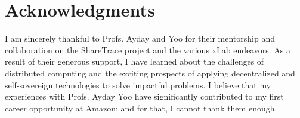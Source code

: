 \section*{Acknowledgments}
I am sincerely thankful to Profs. Ayday and Yoo for their mentorship and collaboration on the ShareTrace project and the various xLab endeavors. As a result of their generous support, I have learned about the challenges of distributed computing and the exciting prospects of applying decentralized and self-sovereign technologies to solve impactful problems. I believe that my experiences with Profs. Ayday Yoo have significantly contributed to my first career opportunity at Amazon; and for that, I cannot thank them enough.


\clearpage